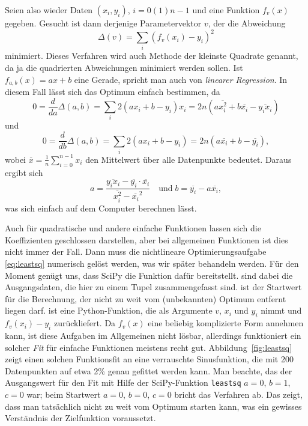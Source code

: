 Seien also wieder Daten $(x_i, y_i)$, $i=0(1)n-1$ und eine Funktion
$f_v(x)$ gegeben. Gesucht ist dann derjenige Parametervektor $v$, der
die Abweichung
\begin{equation}
  \label{eq:leastsq}
  \Delta(v) = \sum_i (f_v(x_i) - y_i)^2
\end{equation}
minimiert. Dieses Verfahren wird auch Methode der kleinste Quadrate
genannt, da ja die quadrierten Abweichungen minimiert werden
sollen. Ist $f_{a,b}(x) = ax + b$ eine Gerade, spricht man auch von
\emph{linearer Regression}. In diesem Fall lässt
sich das Optimum einfach bestimmen, da
\begin{equation}
  0 = \frac{d}{da} \Delta(a,b) = \sum_i 2 (a x_i + b - y_i)x_i
  = 2n \left(a  \overline{x_i^2} + b \overline{x_i} -
    \overline{y_ix_i} \right)
\end{equation}
und
\begin{equation}
  0 = \frac{d}{db} \Delta(a,b) = \sum_i 2 (a x_i + b - y_i)
  = 2n \left(a  \overline{x_i} + b - \overline{y_i} \right),
\end{equation}
wobei $\overline{x} = \frac{1}{n} \sum_{i=0}^{n-1} x_i$ den Mittelwert
über alle Datenpunkte bedeutet. Daraus ergibt sich
\begin{equation}
  a = \frac{\overline{y_ix_i} -
    \overline{y_i}\cdot\overline{x_i}}{\overline{x_i^2}-\overline{x_i}^2}
  \quad\text{und}\;
  b = \overline{y_i} - a \overline{x_i},
\end{equation}
was sich einfach auf dem Computer berechnen lässt.

Auch für quadratische und andere einfache Funktionen lassen sich die
Koeffizienten geschlossen darstellen, aber bei allgemeinen Funktionen
ist dies nicht immer der Fall. Dann muss die nichtlineare
Optimierungsaufgabe \eqref{eq:leastsq} numerisch gelöst werden, was
wir später behandeln werden. Für den Moment genügt uns, dass SciPy die
Funktion  dafür
bereitstellt.  sind dabei die Ausgangsdaten, die hier zu
einem Tupel zusammengefasst sind.  ist der Startwert für die
Berechnung, der nicht zu weit vom (unbekannten) Optimum entfernt
liegen darf.  ist eine Python-Funktion, die als Argumente
$v$, $x_i$ und $y_i$ nimmt und $f_v(x_i) - y_i$ zurückliefert.  Da
$f_v(x)$ eine beliebig komplizierte Form annehmen kann, ist diese
Aufgaben im Allgemeinen nicht lösbar, allerdings funktioniert ein
solcher \emph{Fit} für einfache Funktionen meistens recht
gut. Abbildung~\ref{fig:leastsq} zeigt einen solchen Funktionsfit an
eine verrauschte Sinusfunktion, die mit 200 Datenpunkten auf etwa 2\%
genau gefittet werden kann. Man beachte, das der Ausgangswert für den
Fit mit Hilfe der SciPy-Funktion \lstinline!leastsq! $a=0$, $b=1$,
$c=0$ war; beim Startwert $a=0$, $b=0$, $c=0$ bricht das Verfahren
ab. Das zeigt, dass man tatsächlich nicht zu weit vom Optimum starten
kann, was ein gewisses Verständnis der Zielfunktion voraussetzt.


